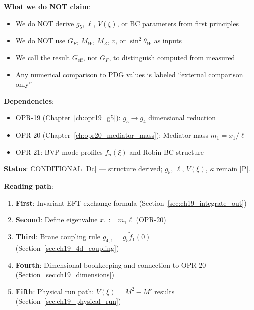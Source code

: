 \begin{tcolorbox}[colback=blue!5!white, colframe=blue!50!black,
    title=\textbf{Reader's Map: What This Chapter Does and Does Not Claim}]
\textbf{What we do NOT claim}:
\begin{itemize}
    \item We do NOT derive $g_5$, $\ell$, $V(\xi)$, or BC parameters from first principles
    \item We do NOT use $G_F$, $M_W$, $M_Z$, $v$, or $\sin^2\theta_W$ as inputs
    \item We call the result $G_{\text{eff}}$, not $G_F$, to distinguish computed from measured
    \item Any numerical comparison to PDG values is labeled ``external comparison only''
\end{itemize}

\textbf{Dependencies}:
\begin{itemize}
    \item OPR-19 (Chapter~\ref{ch:opr19_g5}): $g_5 \to g_4$ dimensional reduction
    \item OPR-20 (Chapter~\ref{ch:opr20_mediator_mass}): Mediator mass $m_1 = x_1/\ell$
    \item OPR-21: BVP mode profiles $f_n(\xi)$ and Robin BC structure
\end{itemize}

\textbf{Status}: CONDITIONAL [Dc] --- structure derived; $g_5$, $\ell$, $V(\xi)$, $\kappa$ remain [P].

\medskip

\textbf{Reading path}:
\begin{enumerate}
    \item \textbf{First}: Invariant EFT exchange formula (Section~\ref{sec:ch19_integrate_out})
    \item \textbf{Second}: Define eigenvalue $x_1 := m_1 \ell$ (OPR-20)
    \item \textbf{Third}: Brane coupling rule $g_{4,1} = g_5 \tilde{f}_1(0)$ (Section~\ref{sec:ch19_4d_coupling})
    \item \textbf{Fourth}: Dimensional bookkeeping and connection to OPR-20 (Section~\ref{sec:ch19_dimensions})
    \item \textbf{Fifth}: Physical run path: $V(\xi) = M^2 - M'$ results (Section~\ref{sec:ch19_physical_run})
\end{enumerate}

\end{tcolorbox}


